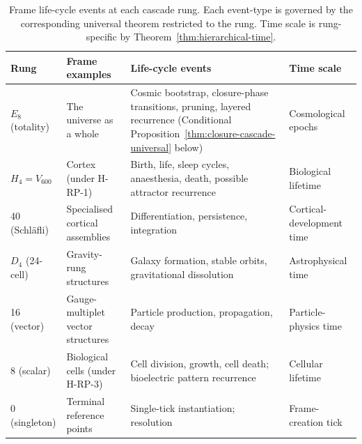 \documentclass[11pt]{article}
\theoremstyle{plain}
\theoremstyle{definition}
\theoremstyle{remark}
\begin{document}
\begin{table}[h]
\centering
\small
\caption{Frame life-cycle events at each cascade rung. Each event-type is governed by the corresponding universal theorem restricted to the rung. Time scale is rung-specific by Theorem~\ref{thm:hierarchical-time}.}\label{tab:rung-life-cycle}
\begin{tabular}{p{2cm}p{2.5cm}p{4cm}p{3.5cm}}
\toprule
Rung & Frame examples & Life-cycle events & Time scale \\
\midrule
$E_8$ (totality) & The universe as a whole & Cosmic bootstrap, closure-phase transitions, pruning, layered recurrence (Conditional Proposition~\ref{thm:closure-cascade-universal} below) & Cosmological epochs \\
$H_4 = V_{600}$ & Cortex (under H-RP-1) & Birth, life, sleep cycles, anaesthesia, death, possible attractor recurrence & Biological lifetime \\
40 (Schläfli) & Specialised cortical assemblies & Differentiation, persistence, integration & Cortical-development time \\
$D_4$ (24-cell) & Gravity-rung structures & Galaxy formation, stable orbits, gravitational dissolution & Astrophysical time \\
16 (vector) & Gauge-multiplet vector structures & Particle production, propagation, decay & Particle-physics time \\
8 (scalar) & Biological cells (under H-RP-3) & Cell division, growth, cell death; bioelectric pattern recurrence & Cellular lifetime \\
0 (singleton) & Terminal reference points & Single-tick instantiation; resolution & Frame-creation tick \\
\bottomrule
\end{tabular}
\end{table}
\end{document}
